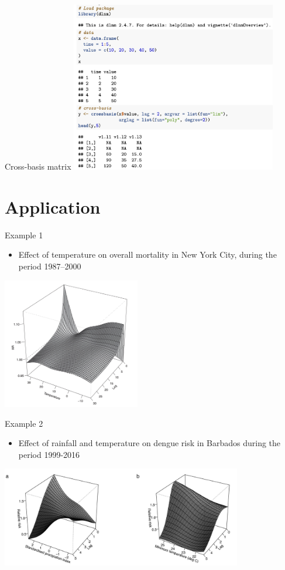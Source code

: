 \documentclass[english]{beamer}
\begin{document}
\begin{frame}{Cross-basis matrix}
\centering
    \includegraphics[width=9cm,keepaspectratio]{images/crossbasis_result.png}
\end{frame}

\section{Application}
\begin{frame}{Example 1}
\begin{itemize}
    \item Effect of temperature on overall mortality in New York City, during the period 1987–2000
\end{itemize}
\centering
    \includegraphics[width=6cm,keepaspectratio]{images/dlnm_example_1.png}
\end{frame}
\begin{frame}{Example 2}
    \begin{itemize}
        \item Effect of rainfall and temperature on dengue risk in Barbados  during the period 1999-2016
    \end{itemize}
\centering
    \includegraphics[width=10.5cm,keepaspectratio]{images/dlnm_example_2.png}    
\end{frame}
\end{document}
